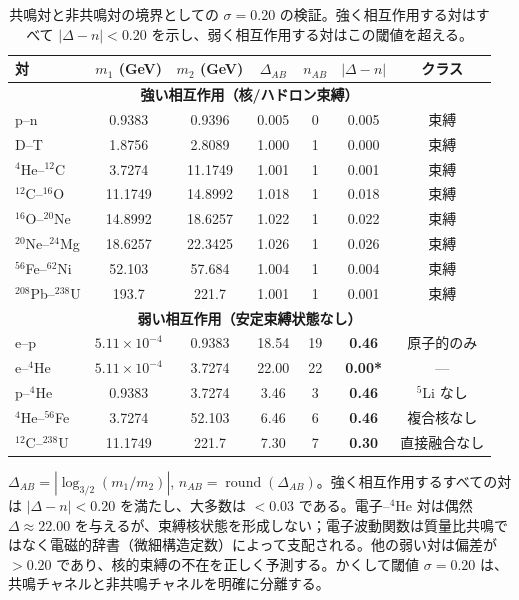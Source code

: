 \documentclass[11pt,a4paper]{article}
\theoremstyle{remark}
\begin{document}
	\begin{table}[H]
		\centering
		\caption{共鳴対と非共鳴対の境界としての \(\sigma = 0.20\) の検証。強く相互作用する対はすべて \(|\Delta-n| < 0.20\) を示し、弱く相互作用する対はこの閾値を超える。}
		\label{tab:sigma_validation_heavy}
		\small
		\begin{tabular}{l c c c c c c}
			\toprule
			対 & \(m_1\) (GeV) & \(m_2\) (GeV) & \(\Delta_{AB}\) & \(n_{AB}\) & \(|\Delta-n|\) & クラス \\
			\midrule
			\multicolumn{7}{c}{\textbf{強い相互作用（核/ハドロン束縛）}} \\
			p--n           & 0.9383 & 0.9396 & 0.005  & 0 & 0.005 & 束縛 \\
			D--T           & 1.8756 & 2.8089 & 1.000  & 1 & 0.000 & 束縛 \\
			$^4$He--$^{12}$C  & 3.7274 & 11.1749& 1.001  & 1 & 0.001 & 束縛 \\
			$^{12}$C--$^{16}$O & 11.1749& 14.8992& 1.018  & 1 & 0.018 & 束縛 \\
			$^{16}$O--$^{20}$Ne& 14.8992& 18.6257& 1.022  & 1 & 0.022 & 束縛 \\
			$^{20}$Ne--$^{24}$Mg& 18.6257& 22.3425& 1.026  & 1 & 0.026 & 束縛 \\
			$^{56}$Fe--$^{62}$Ni& 52.103 & 57.684 & 1.004  & 1 & 0.004 & 束縛 \\
			$^{208}$Pb--$^{238}$U& 193.7  & 221.7  & 1.001  & 1 & 0.001 & 束縛 \\
			\midrule
			\multicolumn{7}{c}{\textbf{弱い相互作用（安定束縛状態なし）}} \\
			e--p           & $5.11\times10^{-4}$ & 0.9383 & 18.54  & 19 & \textbf{0.46} & 原子的のみ \\
			e--$^4$He      & $5.11\times10^{-4}$ & 3.7274 & 22.00  & 22 & \textbf{0.00*} & — \\
			p--$^4$He      & 0.9383 & 3.7274 & 3.46   & 3  & \textbf{0.46} & $^5$Li なし \\
			$^4$He--$^{56}$Fe & 3.7274 & 52.103 & 6.46   & 6  & \textbf{0.46} & 複合核なし \\
			$^{12}$C--$^{238}$U& 11.1749& 221.7  & 7.30   & 7  & \textbf{0.30} & 直接融合なし \\
			\bottomrule
		\end{tabular}
		\par\smallskip
		\footnotesize
		\(\Delta_{AB} = |\log_{3/2}(m_1/m_2)|\), \(n_{AB} = \operatorname{round}(\Delta_{AB})\)。強く相互作用するすべての対は \(|\Delta-n| < 0.20\) を満たし、大多数は \(<0.03\) である。電子--$^4$He 対は偶然 \(\Delta\approx22.00\) を与えるが、束縛核状態を形成しない；電子波動関数は質量比共鳴ではなく電磁的辞書（微細構造定数）によって支配される。他の弱い対は偏差が \(>0.20\) であり、核的束縛の不在を正しく予測する。かくして閾値 \(\sigma = 0.20\) は、共鳴チャネルと非共鳴チャネルを明確に分離する。
	\end{table}
	
\end{document}
